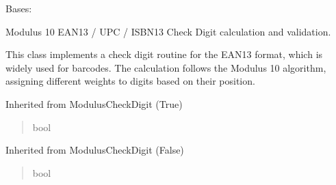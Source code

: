 \documentclass[letterpaper,10pt,english]{sphinxmanual}
\begin{document}
\begin{fulllineitems}
\label{\detokenize{apache_commons_validator_python.routines.checkdigit:apache_commons_validator_python.routines.checkdigit.ean13_checkdigit.EAN13CheckDigit}}
\pysigstartsignatures
{}
\pysigstopsignatures
\sphinxAtStartPar
Bases: 

\sphinxAtStartPar
Modulus 10 EAN\sphinxhyphen{}13 / UPC / ISBN\sphinxhyphen{}13 Check Digit calculation and validation.

\sphinxAtStartPar
This class implements a check digit routine for the EAN\sphinxhyphen{}13 format,
which is widely used for barcodes. The calculation follows the
Modulus 10 algorithm, assigning different weights to digits based
on their position.

\begin{fulllineitems}
\label{\detokenize{apache_commons_validator_python.routines.checkdigit:apache_commons_validator_python.routines.checkdigit.ean13_checkdigit.EAN13CheckDigit.serializable}}
\pysigstartsignatures
{}
\pysigstopsignatures
\sphinxAtStartPar
Inherited from ModulusCheckDigit (True)
\begin{quote}\begin{description}
\sphinxAtStartPar
bool

\end{description}\end{quote}

\end{fulllineitems}


\begin{fulllineitems}
\label{\detokenize{apache_commons_validator_python.routines.checkdigit:apache_commons_validator_python.routines.checkdigit.ean13_checkdigit.EAN13CheckDigit.clone}}
\pysigstartsignatures
{}
\pysigstopsignatures
\sphinxAtStartPar
Inherited from ModulusCheckDigit (False)
\begin{quote}\begin{description}
\sphinxAtStartPar
bool


\end{description}
\end{quote}
\end{fulllineitems}
\end{fulllineitems}
\end{document}
